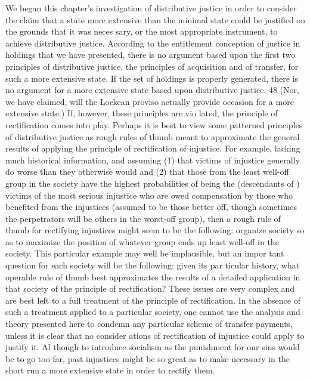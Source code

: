 \documentclass[11pt,openany]{book}
\begin{document}
We began this chapter's investigation of distributive justice in order to consider the claim that a state more extensive than the minimal state could be justified on the grounds that it was neces sary, or the most appropriate instrument, to achieve distributive justice. According to the entitlement conception of justice in holdings that we have presented, there is no argument based upon the first two principles of distributive justice, the principles of acquisition and of transfer, for such a more extensive state. If the set of holdings is properly generated, there is no argument for a more extensive state based upon distributive justice. 48 (Nor, we have claimed, will the Lockean proviso actually provide occasion for a more extensive state.) If, however, these principles are vio lated, the principle of rectification comes into play. Perhaps it is best to view some patterned principles of distributive justice as rough rules of thumb meant to approximate the general results of applying the principle of rectification of injustice. For example, lacking much historical information, and assuming (1) that victims of injustice generally do worse than they otherwise would and (2) that those from the least well-off group in the society have the highest probabilities of being the (descendants of ) victims of the most serious injustice who are owed compensation by those who benefited from the injustices (assumed to be those better off, though sometimes the perpetrators will be others in the worst-off group), then a rough rule of thumb for rectifying injustices might seem to be the following: organize society so as to maximize the position of whatever group ends up least well-off in the society. This particular example may well be implausible, but an impor tant question for each society will be the following: given its par ticular history, what operable rule of thumb best approximates the results of a detailed application in that society of the principle of rectification? These issues are very complex and are best left to a full treatment of the principle of rectification. In the absence of such a treatment applied to a particular society, one cannot use the analysis and theory presented here to condemn any particular scheme of transfer payments, unless it is clear that no consider ations of rectification of injustice could apply to justify it. Al though to introduce socialism as the punishment for our sins would be to go too far, past injustices might be so great as to make necessary in the short run a more extensive state in order to rectify them. 
\end{document}
